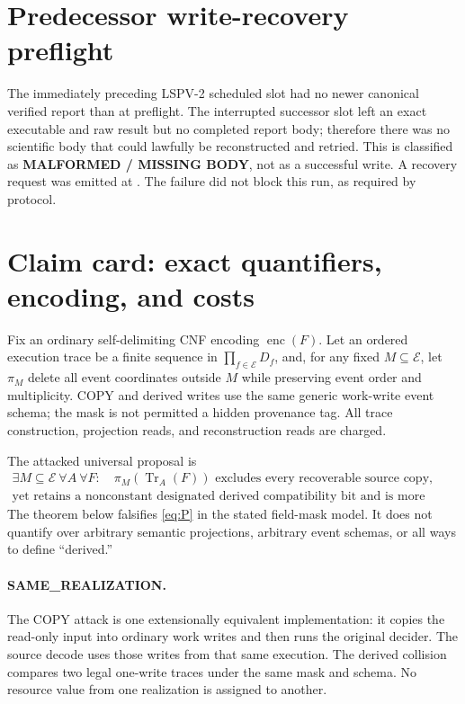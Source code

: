\documentclass[11pt]{article}
\begin{document}
\section{Predecessor write-recovery preflight}

The immediately preceding LSPV-2 scheduled slot had no newer canonical
verified report than
at preflight.  The interrupted successor slot left an exact executable and
raw result but no completed report body; therefore there was no scientific
body that could lawfully be reconstructed and retried.  This is classified
as \textbf{MALFORMED / MISSING BODY}, not as a successful write.  A recovery
request was emitted at
.
The failure did not block this run, as required by protocol.

\section{Claim card: exact quantifiers, encoding, and costs}

Fix an ordinary self-delimiting CNF encoding \(\operatorname{enc}(F)\).
Let an ordered execution trace be a finite sequence in
\(\prod_{f\in\mathcal E}D_f\), and, for any fixed
\(M\subseteq\mathcal E\), let \(\pi_M\) delete all event coordinates outside
\(M\) while preserving event order and multiplicity.  COPY and derived writes
use the same generic work-write event schema; the mask is not permitted a
hidden provenance tag.  All trace construction, projection reads, and
reconstruction reads are charged.

The attacked universal proposal is
\begin{multline}
 \exists M\subseteq\mathcal E\ \forall A\ \forall F:\quad
 \pi_M(\operatorname{Tr}_A(F))\text{ excludes every recoverable source copy,}\tag{P}\label{eq:P}\\
 \text{yet retains a nonconstant designated derived compatibility bit and is
 more informative than the final decision.}
\end{multline}
The theorem below falsifies \eqref{eq:P} in the stated field-mask model.  It
does not quantify over arbitrary semantic projections, arbitrary event
schemas, or all ways to define ``derived.''

\paragraph{SAME\_REALIZATION.}
The COPY attack is one extensionally equivalent implementation: it copies the
read-only input into ordinary work writes and then runs the original decider.
The source decode uses those writes from that same execution.  The derived
collision compares two legal one-write traces under the same mask and schema.
No resource value from one realization is assigned to another.
\end{document}
